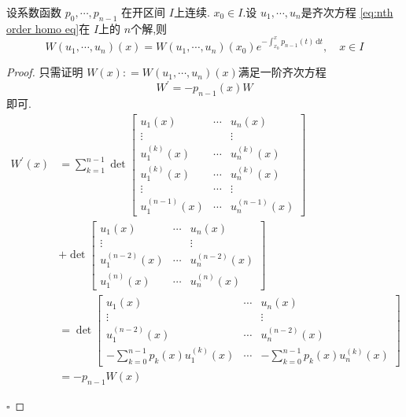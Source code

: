 \documentclass[lang=cn,12pt,color=green,fontset=none]{elegantbook}
\begin{document}
\begin{proposition}
    设系数函数 \(   p_0,\cdots,p_{n-1}   \) 在开区间 \(  I  \)上连续. \(  x_0\in I  \).设 \(   u_1,\cdots,u_n   \)是齐次方程 \ref{eq:nth order homo eq}在 \(  I  \)上的 \(  n  \)个解,则 \[
    W\left(  u_1,\cdots,u_n  \right)\left( x \right)=W\left(  u_1,\cdots,u_n  \right)\left( x_0 \right)e^{-\int_{x_0}^{x}p_{n-1}\left( t \right)\,\mathrm{d} t },\quad x \in I    
    \]     
\end{proposition}
\begin{proof}
    只需证明 \(  W\left( x \right): = W\left(  u_1,\cdots,u_n  \right)\left( x \right)     \)满足一阶齐次方程 \[
    W^{\prime} =-p_{n-1}\left( x \right)W 
    \]即可.
    \[
    \begin{aligned}
    W^{\prime} \left( x \right) & = \sum _{k=1}^{n-1} \det \begin{bmatrix} 
         u_1\left( x \right)&\cdots & u_{n}\left( x \right)\\ 
          \vdots& & \vdots\\ 
        u_1^{\left( k \right) }\left( x \right) &\cdots & u_{n}^{\left( k \right) }\left( x \right) \\ 
         u_1^{\left( k \right) }\left( x \right) &\cdots & u_{n}^{\left( k \right) }\left( x \right) \\ 
         \vdots&\cdots &\vdots\\ 
          u_1^{\left( n-1 \right) }\left( x \right)& \cdots  & u_{n}^{\left( n-1 \right) }\left( x \right) 
    \end{bmatrix}   \\ 
     & +  \det \begin{bmatrix} 
         u_1\left( x \right)&\cdots &u_{n}\left( x \right)\\ 
          \vdots&&\vdots\\ 
           u_1^{\left( n-2 \right) }\left( x \right)&\cdots &u_{n}^{\left( n-2 \right) }\left( x \right)     \\ 
            u_{1}^{\left( n \right) }\left( x \right)&\cdots &u_{n}^{\left( n \right) }\left( x \right)  
     \end{bmatrix} \\ 
      & = \det \begin{bmatrix} 
          u_1\left( x \right)&\cdots &u_{n}\left( x \right)\\ 
           \vdots& &\vdots\\ 
            u_1^{\left( n-2 \right) }\left( x \right)&\cdots & u_{n}^{\left( n-2 \right) }\left( x \right) \\ 
           - \sum _{k=0}^{n-1} p_{k}\left( x \right)u_1^{\left( k \right) }\left( x \right)  &\cdots & - \sum _{k=0}^{n-1} p_{k}\left( x \right)u_n^{\left( k \right) }\left( x \right) 
      \end{bmatrix} \\ 
       & = -p_{n-1} W\left( x \right) 
    \end{aligned}
    \] 

    \hfill $\square$
\end{proof}
\end{document}
